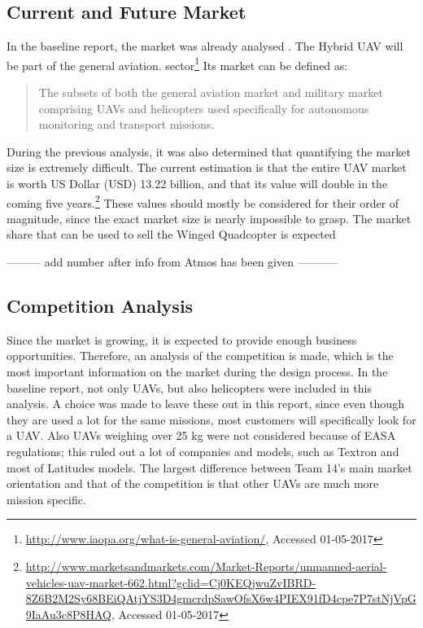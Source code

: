 \subsection{Current and Future Market}


In the baseline report, the market was already analysed \cite{baseline}. The Hybrid UAV will be part of the general aviation. sector\footnote{\url{http://www.iaopa.org/what-is-general-aviation/}, Accessed 01-05-2017} Its market can be defined as:

\begin{quote}
\begin{itshape}
The subsets of both the general aviation market and military market comprising UAVs and helicopters used specifically for autonomous monitoring and transport missions.
\end{itshape}
\end{quote}

During the previous analysis, it was also determined that quantifying the market size is extremely difficult. The current estimation is that the entire UAV market is worth US Dollar (USD) 13.22 billion, and that its value will double in the coming five years.\footnote{\url{http://www.marketsandmarkets.com/Market-Reports/unmanned-aerial-vehicles-uav-market-662.html?gclid=Cj0KEQjwuZvIBRD-8Z6B2M2Sy68BEiQAtjYS3D4gmcrdpSawOfsX6w4PIEX91fD4cpe7P7stNjVpG9IaAu3c8P8HAQ}, Accessed 01-05-2017} These values should mostly be considered for their order of magnitude, since the exact market size is nearly impossible to grasp. The market share that can be used to sell the Winged Quadcopter is expected 

--------- add number after info from Atmos has been given -----------





\subsection{Competition Analysis}
Since the market is growing, it is expected to provide enough business opportunities. Therefore, an analysis of the competition is made, which is the most important information on the market during the design process. In the baseline report, not only UAVs, but also helicopters were included in this analysis. A choice was made to leave these out in this report, since even though they are used a lot for the same missions, most customers will specifically look for a UAV. Also UAVs weighing over 25 kg were not considered because of EASA regulations; this ruled out a lot of companies and models, such as Textron and most of Latitudes models. The largest difference between Team 14's main market orientation and that of the competition is that other UAVs are much more mission specific.%

